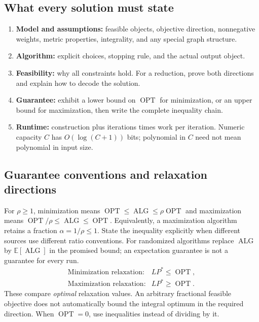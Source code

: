 \documentclass[10pt]{article}
\theoremstyle{definition}
\newcommand{\OPT}{\operatorname{OPT}}
\newcommand{\ALG}{\operatorname{ALG}}
\begin{document}
\subsection{What every solution must state}
\begin{enumerate}
\item \textbf{Model and assumptions:} feasible objects, objective direction, nonnegative
weights, metric properties, integrality, and any special graph structure.
\item \textbf{Algorithm:} explicit choices, stopping rule, and the actual output object.
\item \textbf{Feasibility:} why all constraints hold. For a reduction, prove both directions
and explain how to decode the solution.
\item \textbf{Guarantee:} exhibit a lower bound on $\OPT$ for minimization, or an upper
bound for maximization, then write the complete inequality chain.
\item \textbf{Runtime:} construction plus iterations times work per iteration. Numeric
capacity $C$ has $O(\log(C+1))$ bits; polynomial in $C$ need not mean polynomial in input size.
\end{enumerate}

\subsection{Guarantee conventions and relaxation directions}
For $\rho\ge1$, minimization means $\OPT\le\ALG\le\rho\OPT$ and maximization means
$\OPT/\rho\le\ALG\le\OPT$. Equivalently, a maximization algorithm retains a fraction
$\alpha=1/\rho\le1$. State the inequality explicitly when different sources use different
ratio conventions. For randomized algorithms replace $\ALG$ by $\mathbb E[\ALG]$ in the
promised bound; an expectation guarantee is not a guarantee for every run.
\[
\begin{array}{ll}
\text{Minimization relaxation:}&LP^*\le\OPT,\\
\text{Maximization relaxation:}&LP^*\ge\OPT.
\end{array}
\]
These compare \emph{optimal} relaxation values. An arbitrary fractional feasible objective
does not automatically bound the integral optimum in the required direction. When $\OPT=0$,
use inequalities instead of dividing by it.
\end{document}

